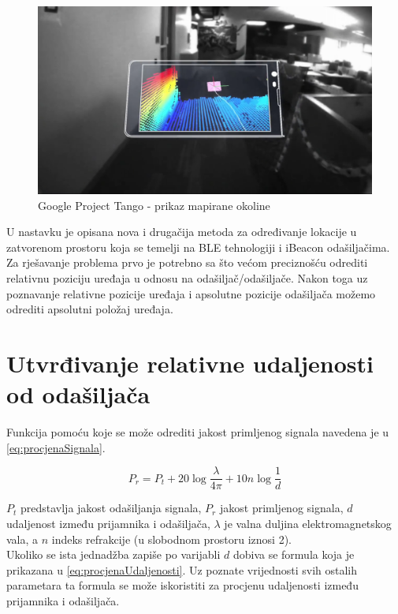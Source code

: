 \begin{figure}[H]
    \centering
    \includegraphics[scale=0.24]{pictures/tango2}
    \caption{Google Project Tango - prikaz mapirane okoline}
\end{figure}

U nastavku je opisana nova i drugačija metoda za određivanje lokacije u zatvorenom prostoru koja se temelji na BLE tehnologiji i iBeacon odašiljačima. 
Za rješavanje problema prvo je potrebno sa što većom preciznošću odrediti relativnu poziciju uređaja u odnosu na odašiljač/odašiljače. 
Nakon toga uz poznavanje relativne pozicije uređaja i apsolutne pozicije odašiljača možemo odrediti apsolutni položaj uređaja.

\section*{Utvrđivanje relativne udaljenosti od odašiljača}

Funkcija pomoću koje se može odrediti jakost primljenog signala navedena je u \eqref{eq:procjenaSignala}.

\begin{equation}
	\label{eq:procjenaSignala}
	P_r = P_t + 20\log{\frac{\lambda}{4\pi}} + 10n\log{\frac{1}{d}}
\end{equation}

$P_t$ predstavlja jakost odašiljanja signala, $P_r$ jakost primljenog signala, $d$ udaljenost između prijamnika i odašiljača, $\lambda$ je valna duljina elektromagnetskog vala, a $n$ indeks refrakcije (u slobodnom prostoru iznosi 2).
\\

Ukoliko se ista jednadžba zapiše po varijabli $d$ dobiva se formula koja je prikazana u \eqref{eq:procjenaUdaljenosti}. 
Uz poznate vrijednosti svih ostalih parametara ta formula se može iskoristiti za procjenu udaljenosti između prijamnika i odašiljača.

